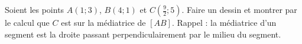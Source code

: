 
\begin{exercice}\label{exosmath-0515}

    Soient les points \( A(1;3)\), \( B(4;1)\) et \( C(\frac{ 9 }{ 2 };5)\). Faire un dessin et montrer par le calcul que \( C\) est sur la médiatrice de \( [AB]\). Rappel : la médiatrice d'un segment est la droite passant perpendiculairement par le milieu du segment.

\end{exercice}
